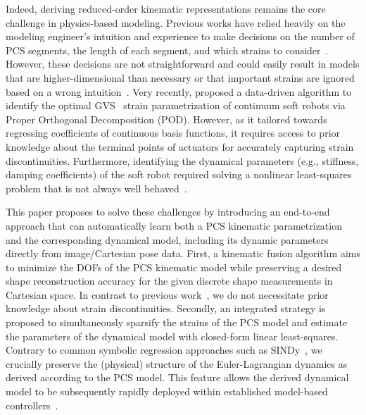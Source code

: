 %
Indeed, deriving reduced-order kinematic representations remains the core challenge in physics-based modeling. 
%
Previous works have relied heavily on the modeling engineer's intuition and experience to make decisions on the number of \gls{PCS} segments, the length of each segment, and which strains to consider~\citep{toshimitsu2021sopra}. However, these decisions are not straightforward and could easily result in models that are higher-dimensional than necessary or that important strains are ignored based on a wrong intuition~\citep{garg2022kinematic}.
Very recently, \citet{alkayas2025soft} proposed a data-driven algorithm to identify the optimal \gls{GVS}~\citep{boyer2020dynamics} strain parametrization of continuum soft robots via Proper Orthogonal Decomposition (POD). However, as it tailored towards regressing coefficients of continuous basis functions, it requires access to prior knowledge about the terminal points of actuators for accurately capturing strain discontinuities.
Furthermore, identifying the dynamical parameters (e.g., stiffness, damping coefficients) of the soft robot required solving a nonlinear least-squares problem that is not always well behaved~\citep{stolzle2024experimental}.

This paper proposes to solve these challenges by introducing an end-to-end approach that can automatically learn both a \gls{PCS} kinematic parametrization and the corresponding dynamical model, including its dynamic parameters directly from image/Cartesian pose data.
First, a kinematic fusion algorithm aims to minimize the \glspl{DOF} of the \gls{PCS} kinematic model while preserving a desired shape reconstruction accuracy for the given discrete shape measurements in Cartesian space. In contrast to previous work~\citep{alkayas2025soft}, we do not necessitate prior knowledge about strain discontinuities.
Secondly, an integrated strategy is proposed to simultaneously sparsify the strains of the \gls{PCS} model and estimate the parameters of the dynamical model with closed-form linear least-squares.
Contrary to common symbolic regression approaches such as SINDy~\citep{kaiser2018sparse}, we crucially preserve the (physical) structure of the Euler-Lagrangian dynamics as derived according to the \gls{PCS} model.
This feature allows the derived dynamical model to be subsequently rapidly deployed within established model-based controllers~\citep{della2023model}.

